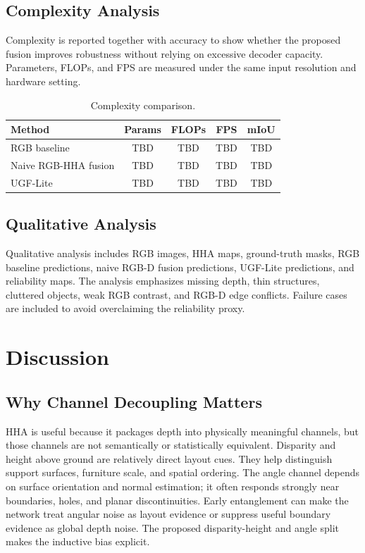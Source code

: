 \documentclass[a4paper,fleqn]{cas-dc}
\begin{document}
\subsection{Complexity Analysis}

Complexity is reported together with accuracy to show whether the proposed fusion improves robustness without relying on excessive decoder capacity. Parameters, FLOPs, and FPS are measured under the same input resolution and hardware setting.

\begin{table}%
\caption{Complexity comparison.}\label{tab:complexity}
\begin{tabular*}{\tblwidth}{@{\extracolsep{\fill}}lcccc@{}}
\toprule
Method & Params & FLOPs & FPS & mIoU \\
\midrule
RGB baseline & TBD & TBD & TBD & TBD \\
Naive RGB-HHA fusion & TBD & TBD & TBD & TBD \\
UGF-Lite & TBD & TBD & TBD & TBD \\
\bottomrule
\end{tabular*}
\end{table}

\subsection{Qualitative Analysis}

Qualitative analysis includes RGB images, HHA maps, ground-truth masks, RGB baseline predictions, naive RGB-D fusion predictions, UGF-Lite predictions, and reliability maps. The analysis emphasizes missing depth, thin structures, cluttered objects, weak RGB contrast, and RGB-D edge conflicts. Failure cases are included to avoid overclaiming the reliability proxy.

\section{Discussion}\label{sec:discussion}

\subsection{Why Channel Decoupling Matters}

HHA is useful because it packages depth into physically meaningful channels, but those channels are not semantically or statistically equivalent. Disparity and height above ground are relatively direct layout cues. They help distinguish support surfaces, furniture scale, and spatial ordering. The angle channel depends on surface orientation and normal estimation; it often responds strongly near boundaries, holes, and planar discontinuities. Early entanglement can make the network treat angular noise as layout evidence or suppress useful boundary evidence as global depth noise. The proposed disparity-height and angle split makes the inductive bias explicit.
\end{document}

